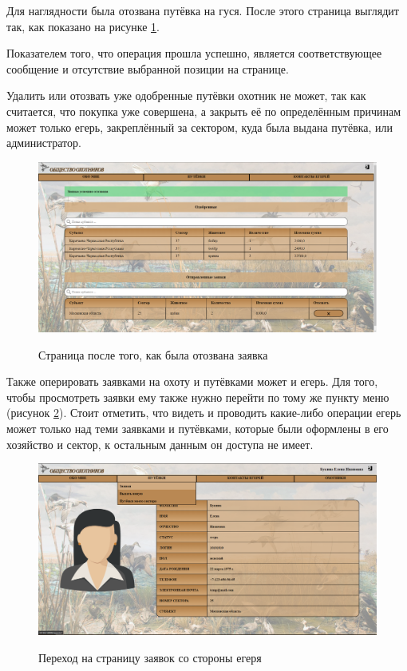 	Для наглядности была отозвана путёвка на гуся. После этого страница выглядит так, как показано на рисунке \ref{fig19:image}. 
	
	Показателем того, что операция прошла успешно, является соответствующее сообщение и отсутствие выбранной позиции на странице. 
	
	Удалить или отозвать уже одобренные путёвки охотник не может, так как считается, что покупка уже совершена, а закрыть её по определённым причинам может только егерь, закреплённый за сектором, куда была выдана путёвка, или администратор.
	
	\begin{figure}[pt!]
		\centering
		\begin{center}
			{\includegraphics[scale=0.34]{schemes/screens/after_del_huntsman.png}}
			\caption{Страница после того, как была отозвана заявка}
			\label{fig19:image}
		\end{center}
	\end{figure}
	\newpage

	Также оперировать заявками на охоту и путёвками может и егерь. Для того, чтобы просмотреть заявки ему также нужно перейти по тому же пункту меню (рисунок \ref{fig20:image}). Стоит отметить, что видеть и проводить какие-либо операции егерь может только над теми заявками и путёвками, которые были оформлены в его хозяйство и сектор, к остальным данным он доступа не имеет.
	
	\begin{figure}[h]
		\centering
		\begin{center}
			{\includegraphics[scale=0.34]{schemes/screens/huntsman_start.png}}
			\caption{Переход на страницу заявок со стороны егеря}
			\label{fig20:image}
		\end{center}
	\end{figure}
	\newpage

